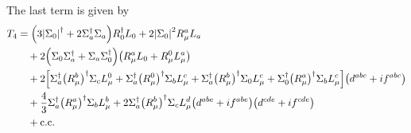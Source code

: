 The last term is given by
\begin{align}
    T_{4}
     & =
    \qty(3\qty|\Sigma_0|^{\dagger} + 2\Sigma^{\dagger}_{a}\Sigma_{a})R^{\dagger}_{0}L_{0}
    + 2\qty|\Sigma_{0}|^{2}R^{a}_{\mu}L_{a}               \\
     & \quad +
    2\qty(
    \Sigma_{0}\Sigma^{\dagger}_{a}
    +\Sigma_{a}\Sigma^{\dagger}_{0}
    )
    \qty(R^{a}_{\mu}L_{0} + R^{0}_{\mu}L^{a}_{\mu})\notag \\
     & \quad +
    2\qty[
    \Sigma^{\dagger}_{a}\qty(R^{b}_{\mu})^{\dagger}\Sigma_{c}L^{0}_{\mu} +
    \Sigma^{\dagger}_{a}\qty(R^{0}_{\mu})^{\dagger}\Sigma_{b}L^{c}_{\mu} +
    \Sigma^{\dagger}_{a}\qty(R^{b}_{\mu})^{\dagger}\Sigma_{0}L^{c}_{\mu} +
    \Sigma^{\dagger}_{0}\qty(R^{a}_{\mu})^{\dagger}\Sigma_{b}L^{c}_{\mu}
    ]\qty(d^{abc} + if^{abc})
    \notag                                                \\
     & \quad
    + \frac{4}{3}\Sigma^{\dagger}_{a}\qty(R^{a}_{\mu})^{\dagger}\Sigma_{b}L^{b}_{\mu}
    + 2\Sigma^{\dagger}_{a}\qty(R^{b}_{\mu})^{\dagger}\Sigma_{c}L^{d}_{\mu}
    \qty(d^{abe} +i f^{abe} )
    \qty(d^{cde} +i f^{cde} )\notag                       \\
     & \quad
    +\mathrm{c.c.}
\end{align}

